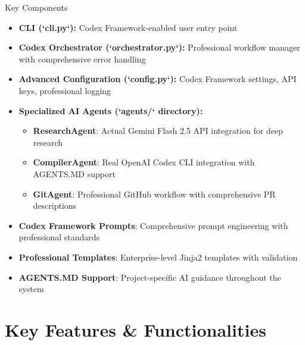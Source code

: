\documentclass{beamer}
\begin{document}
\begin{frame}{Key Components}
    \begin{itemize}
        \item \textbf{CLI (`cli.py`):} Codex Framework-enabled user entry point
        \item \textbf{Codex Orchestrator (`orchestrator.py`):} Professional workflow manager with comprehensive error handling
        \item \textbf{Advanced Configuration (`config.py`):} Codex Framework settings, API keys, professional logging
        \item \textbf{Specialized AI Agents (`agents/` directory):}
            \begin{itemize}
                \item \textbf{ResearchAgent}: Actual Gemini Flash 2.5 API integration for deep research
                \item \textbf{CompilerAgent}: Real OpenAI Codex CLI integration with AGENTS.MD support
                \item \textbf{GitAgent}: Professional GitHub workflow with comprehensive PR descriptions
            \end{itemize}
        \item \textbf{Codex Framework Prompts}: Comprehensive prompt engineering with professional standards
        \item \textbf{Professional Templates}: Enterprise-level Jinja2 templates with validation
        \item \textbf{AGENTS.MD Support}: Project-specific AI guidance throughout the system
    \end{itemize}
\end{frame}

\section{Key Features & Functionalities} \label{L_section_features}
\end{document}
